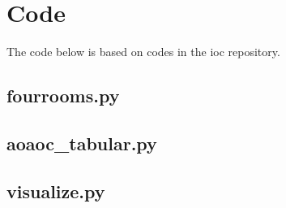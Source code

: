 \documentclass{article}
\begin{document}
	\section{Code}
	The code below is based on codes in the ioc repository.\cite{iocrepo}
	\lstset{style=code}
	\subsection*{fourrooms.py}
	
	\subsection*{aoaoc\_tabular.py}
	
	\subsection*{visualize.py}
	
\end{document}

